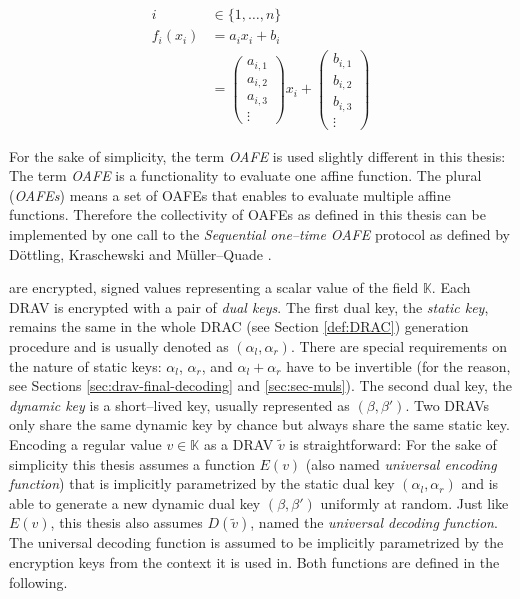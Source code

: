\begin{align*}
  i &\in \{1, \ldots, n\}\\
%
  f_i(x_i) &=
  a_ix_i + b_i \\
%
  &=
\begin{pmatrix}a_{i,1}\\a_{i,2}\\a_{i,3}\\\vdots\end{pmatrix}x_i +
\begin{pmatrix}b_{i,1}\\b_{i,2}\\b_{i,3}\\\vdots\end{pmatrix}
\end{align*}

\noindent{}For the sake of simplicity, the term \emph{OAFE} is used slightly
different in this thesis: The term \emph{OAFE} is a functionality to evaluate
one affine function. The plural (\emph{OAFEs}) means a set of OAFEs that enables
to evaluate multiple affine functions. Therefore the collectivity of OAFEs as
defined in this thesis can be implemented by one call to the \emph{Sequential
one--time OAFE} protocol as defined by Döttling, Kraschewski and Müller--Quade
\cite{davidgoliath}.


%
%
\label{sec:drav}

 are encrypted, signed values
representing a scalar value of the field $\mathbb{K}$. Each DRAV is encrypted
with a pair of \emph{dual keys}. The first dual key, the \emph{static key},
remains the same in the whole DRAC (see Section \ref{def:DRAC}) generation
procedure and is usually denoted as $(\alpha_l, \alpha_r)$. There are special
requirements on the nature of static keys: $\alpha_l$, $\alpha_r$, and $\alpha_l
+ \alpha_r$ have to be invertible (for the reason, see Sections
\ref{sec:drav-final-decoding} and \ref{sec:sec-muls}). The second dual key, the
\emph{dynamic key} is a short--lived key, usually represented as $(\beta,
\beta')$. Two DRAVs only share the same dynamic key by chance but always share
the same static key. Encoding a regular value $v \in \mathbb{K}$ as a DRAV
$\widetilde{v}$ is straightforward: For the sake of simplicity this thesis
assumes a function $E(v)$ (also named \emph{universal encoding function}) that
is implicitly parametrized by the static dual key $(\alpha_l, \alpha_r)$ and is
able to generate a new dynamic dual key $(\beta, \beta')$ uniformly at random.
Just like $E(v)$, this thesis also assumes $D(\widetilde{v})$, named the
\emph{universal decoding function}.  The universal decoding function is assumed
to be implicitly parametrized by the encryption keys from the context it is used
in. Both functions are defined in the following.

